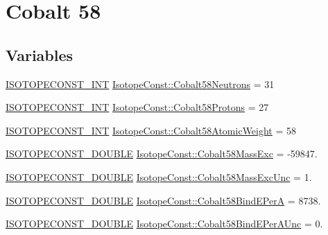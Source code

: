 \hypertarget{group___isotope_const-_cobalt-_co58}{}\section{Cobalt 58}
\label{group___isotope_const-_cobalt-_co58}
\subsection*{Variables}
\begin{DoxyCompactItemize}
\item 
\mbox{\hyperlink{group___isotope_const-_macros_ga5f18360b3e99483a35c32d789e62621c}{I\+S\+O\+T\+O\+P\+E\+C\+O\+N\+S\+T\+\_\+\+I\+NT}} \mbox{\hyperlink{group___isotope_const-_cobalt-_co58_ga7e83b126fd1dbba5be8dc14ce6c5a65f}{Isotope\+Const\+::\+Cobalt58\+Neutrons}} = 31
\item 
\mbox{\hyperlink{group___isotope_const-_macros_ga5f18360b3e99483a35c32d789e62621c}{I\+S\+O\+T\+O\+P\+E\+C\+O\+N\+S\+T\+\_\+\+I\+NT}} \mbox{\hyperlink{group___isotope_const-_cobalt-_co58_ga2fbab49c0fc6bf78e8ca01ccaa4a10d2}{Isotope\+Const\+::\+Cobalt58\+Protons}} = 27
\item 
\mbox{\hyperlink{group___isotope_const-_macros_ga5f18360b3e99483a35c32d789e62621c}{I\+S\+O\+T\+O\+P\+E\+C\+O\+N\+S\+T\+\_\+\+I\+NT}} \mbox{\hyperlink{group___isotope_const-_cobalt-_co58_ga1a1daae30f93199e5fe02bae170a324c}{Isotope\+Const\+::\+Cobalt58\+Atomic\+Weight}} = 58
\item 
\mbox{\hyperlink{group___isotope_const-_macros_ga8f45a7272ce02c0b4c65c44636ed719a}{I\+S\+O\+T\+O\+P\+E\+C\+O\+N\+S\+T\+\_\+\+D\+O\+U\+B\+LE}} \mbox{\hyperlink{group___isotope_const-_cobalt-_co58_ga2df85e424a51ef4a3ef4eb130fbebcad}{Isotope\+Const\+::\+Cobalt58\+Mass\+Exc}} = -\/59847.
\item 
\mbox{\hyperlink{group___isotope_const-_macros_ga8f45a7272ce02c0b4c65c44636ed719a}{I\+S\+O\+T\+O\+P\+E\+C\+O\+N\+S\+T\+\_\+\+D\+O\+U\+B\+LE}} \mbox{\hyperlink{group___isotope_const-_cobalt-_co58_ga8bee573b95a034c4e35aa35e0a0cf47a}{Isotope\+Const\+::\+Cobalt58\+Mass\+Exc\+Unc}} = 1.
\item 
\mbox{\hyperlink{group___isotope_const-_macros_ga8f45a7272ce02c0b4c65c44636ed719a}{I\+S\+O\+T\+O\+P\+E\+C\+O\+N\+S\+T\+\_\+\+D\+O\+U\+B\+LE}} \mbox{\hyperlink{group___isotope_const-_cobalt-_co58_ga3c19c9774cc61c8d1bc23f1d5ab40c81}{Isotope\+Const\+::\+Cobalt58\+Bind\+E\+PerA}} = 8738.
\item 
\mbox{\hyperlink{group___isotope_const-_macros_ga8f45a7272ce02c0b4c65c44636ed719a}{I\+S\+O\+T\+O\+P\+E\+C\+O\+N\+S\+T\+\_\+\+D\+O\+U\+B\+LE}} \mbox{\hyperlink{group___isotope_const-_cobalt-_co58_gaca8847c4cec7106acba6d56a927ebd5f}{Isotope\+Const\+::\+Cobalt58\+Bind\+E\+Per\+A\+Unc}} = 0.

\end{DoxyCompactItemize}
